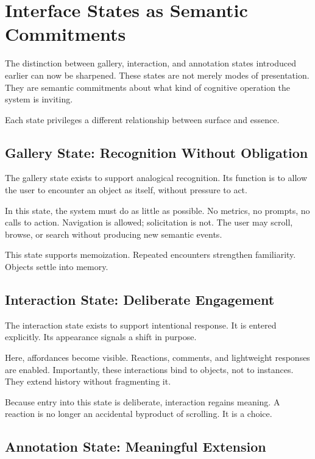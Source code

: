 \documentclass[11pt,oneside]{article}
\begin{document}
\section{Interface States as Semantic Commitments}

The distinction between gallery, interaction, and annotation states introduced earlier can now be sharpened. These states are not merely modes of presentation. They are semantic commitments about what kind of cognitive operation the system is inviting.

Each state privileges a different relationship between surface and essence.

\subsection{Gallery State: Recognition Without Obligation}

The gallery state exists to support analogical recognition. Its function is to allow the user to encounter an object as itself, without pressure to act.

In this state, the system must do as little as possible. No metrics, no prompts, no calls to action. Navigation is allowed; solicitation is not. The user may scroll, browse, or search without producing new semantic events.

This state supports memoization. Repeated encounters strengthen familiarity. Objects settle into memory.

\subsection{Interaction State: Deliberate Engagement}

The interaction state exists to support intentional response. It is entered explicitly. Its appearance signals a shift in purpose.

Here, affordances become visible. Reactions, comments, and lightweight responses are enabled. Importantly, these interactions bind to objects, not to instances. They extend history without fragmenting it.

Because entry into this state is deliberate, interaction regains meaning. A reaction is no longer an accidental byproduct of scrolling. It is a choice.

\subsection{Annotation State: Meaningful Extension}
\end{document}
